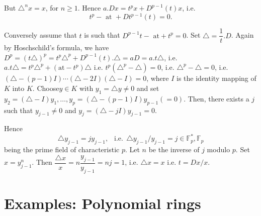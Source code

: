     \noindent
    But $\triangle^n  x =x$, for $n \ge 1$. Hence $a. Dx = t^p x +
    D^{p-1} (t) x$, i.e. 
    $$
    t^p - \text{ at } + Dt^{p-1}(t) = 0.  
    $$
    
    Conversely assume that $t$ is such that $D^{p-1} t - \text{ at} + t^p =
    0$. Set $\triangle = \dfrac{1}{t}. D$. Again by Hoschschild's
    formula, we have $D^p = (t \triangle)^p = t^p \triangle^p + D^{p-1}
    (t). \triangle = aD = a.t \triangle$, i.e. $a.t \triangle = t^p
    \triangle^p + 
    (\text{at} - t^p)\triangle $ i.e. $t^p (\triangle^p - \triangle) = 0$,
    i.e. $\triangle^p - \triangle = 0$, i.e. $(\triangle - (p-1) I)
    \cdots (\triangle - 2 I) (\triangle - I) = 0$, where $I$ is the
    identity mapping of $K$ into $K$. Choose\pageoriginale $y \in K$
    with $y_1 = 
    \triangle y \neq 0$ and set $y_2 = (\triangle - I) y_1, \ldots ,
    y_p = (\triangle - (p-1)I) y_{p-1} (= 0)$. Then, there exists
    a $j$ such that $y_{j - 1} \neq 0$ and $y_j = (\triangle - j I)
    y_{j - 1} = 0$. 
    
    \noindent
    Hence
    $$
    \triangle y_{j - 1}  = jy_{j - 1}, ~~ \text{ i.e.} ~~\triangle
    y_{j-1} \big/ y_{j-1} = j \in \mathbb{F}_p^*, \mathbb{F}_p 
    $$
    being the prime field of characteristic $p$. Let $n$ be the
    inverse of $j$ modulo $p$. Set $x = y^n_{j - 1}$. Then
    $\dfrac{\triangle x}{x} =  n \dfrac{y_{j-1}}{y_{j-1}} = nj = 1$,
    i.e. $\triangle x = x $ i.e. $t = Dx/x$. 
    


\section{Examples: Polynomial rings}\label{chap3:sec4}%
                                                                             
